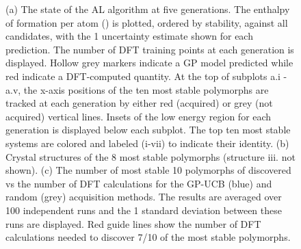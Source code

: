 \begin{figure}[!htb]
\centering
{}
\caption{\label{fig:iro3_al}
%
(a) The state of the AL algorithm at five generations.
%
The enthalpy of formation per atom (\DHf) is plotted, ordered by stability, against all \IrOthree candidates, with the 1 \sigma uncertainty estimate shown for each prediction.
%
The number of DFT training points at each generation is displayed.
%
Hollow grey markers indicate a GP model predicted \DHf while red indicate a DFT-computed quantity.
%
At the top of subplots a.i - a.v, the x-axis positions of the ten most stable polymorphs are tracked at each generation by either red (acquired) or grey (not acquired) vertical lines.
%
Insets of the low energy region for each generation is displayed below each subplot.
%
The top ten most stable systems are colored and labeled (i-vii) to indicate their identity.
%
(b) Crystal structures of the \num{8} most stable \IrOthree polymorphs (structure iii. not shown).
%
%
(c) The number of most stable \num{10} polymorphs of \IrOthree discovered vs the number of DFT calculations for the GP-UCB (blue) and random (grey) acquisition methods.
%
The results are averaged over \num{100} independent runs and the 1 \sigma standard deviation between these runs are displayed.
%
Red guide lines show the number of DFT calculations needed to discover \num{7/10} of the most stable polymorphs.
}
\end{figure}

